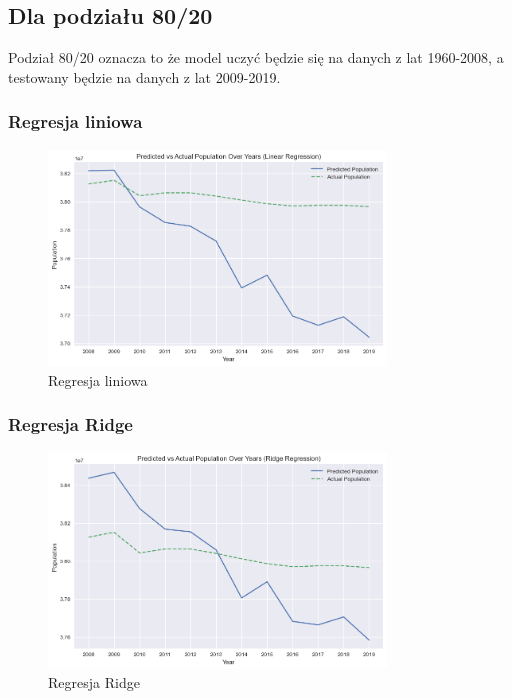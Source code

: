 \documentclass[11pt]{article}
\begin{document}
\subsection*{Dla podziału 80/20}
Podział 80/20 oznacza to że model uczyć będzie się na danych z lat 1960-2008, a testowany będzie na danych z lat 2009-2019.
\subsubsection*{Regresja liniowa}
\begin{figure}[H]
        \centering
        \includegraphics[width=0.8\textwidth]{images/linear.png}
        \caption{Regresja liniowa}
\end{figure}
\subsubsection*{Regresja Ridge}
\begin{figure}[H]
        \centering
        \includegraphics[width=0.8\textwidth]{images/ridge.png}
        \caption{Regresja Ridge}
\end{figure}
\end{document}
